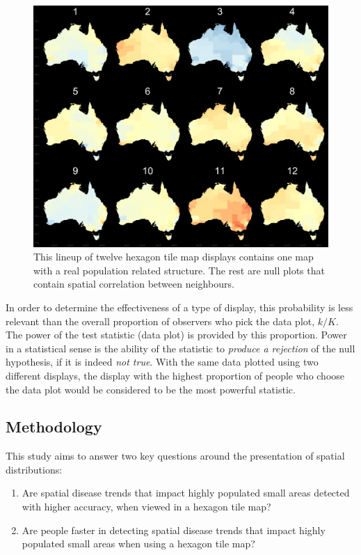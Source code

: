 \documentclass{monashthesis}
\begin{document}
\begin{figure}[H]
\centering
\includegraphics[width=16cm]{figures/04-experiment/aus_cities_3_geo.png}
\caption{\label{fig:lineup}This lineup of twelve hexagon tile map displays contains one map with a real population related structure. The rest are null plots that contain spatial correlation between neighbours.}
\end{figure}

In order to determine the effectiveness of a type of display, this probability is less relevant than the overall proportion of observers who pick the data plot, \(k/K\). The power of the test statistic (data plot) is provided by this proportion. Power in a statistical sense is the ability of the statistic to \emph{produce a rejection} of the null hypothesis, if it is indeed \emph{not true}. With the same data plotted using two different displays, the display with the highest proportion of people who choose the data plot would be considered to be the most powerful statistic.

\hypertarget{methodology}{%
\subsection{Methodology}\label{methodology}}

This study aims to answer two key questions around the presentation of spatial distributions:

\begin{enumerate}
\def\labelenumi{\arabic{enumi}.}
\tightlist
\item
  Are spatial disease trends that impact highly populated small areas detected with higher accuracy, when viewed in a hexagon tile map?
\item
  Are people faster in detecting spatial disease trends that impact highly populated small areas when using a hexagon tile map?
\end{enumerate}
\end{document}
